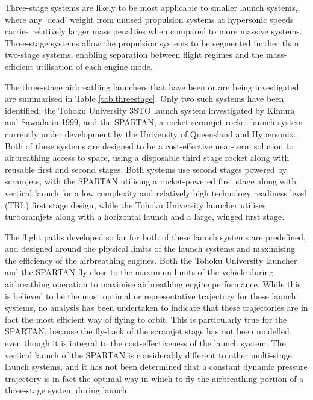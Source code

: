 Three-stage systems are likely to be most applicable to smaller launch systems, where any `dead' weight from unused propulsion systems at hypersonic speeds carries relatively larger mass penalties when compared to more massive systems. Three-stage systems allow the propulsion systems to be segmented further than two-stage systems, enabling separation between flight regimes and the mass-efficient utilisation of each engine mode\cite{Preller2017b}.

The three-stage airbreathing launchers that have been or are being investigated are summarised in Table \ref{tab:threestage}. Only two such systems have been identified; the Tohoku University 3STO launch system investigated by Kimura and Sawada in 1999\cite{Kimura1999}, and the SPARTAN, a rocket-scramjet-rocket launch system currently under development by the University of Queensland and Hypersonix\cite{Preller2017b,Hypersonix}. Both of these systems are designed to be a cost-effective near-term solution to airbreathing access to space, using a disposable third stage rocket along with reusable first and second stages. Both systems use second stages powered by scramjets, with the SPARTAN utilising a rocket-powered first stage along with vertical launch for a low complexity and relatively high technology readiness level (TRL) first stage design, while the Tohoku University launcher utilises turboramjets along with a horizontal launch and a large, winged first stage\cite{Kimura1999}. 

 The flight paths developed so far for both of these launch systems are predefined, and designed around the physical limits of the launch systems and maximising the efficiency of the airbreathing engines. Both the Tohoku University launcher and the SPARTAN fly close to the maximum limits of the vehicle during airbreathing operation to maximise airbreathing engine performance\cite{Preller2017b,Kimura1999}.
While this is believed to be the most optimal or representative trajectory for these launch systems, no analysis has been undertaken to indicate that these trajectories are in fact the most efficient way of flying to orbit. This is particularly true for the SPARTAN, because the fly-back of the scramjet stage has not been modelled, even though it is integral to the cost-effectiveness of the launch system\cite{Preller2017b}. 
The vertical launch of the SPARTAN is considerably different to other multi-stage launch systems, and it has not been determined that a constant dynamic pressure trajectory is in-fact the optimal way in which to fly the airbreathing portion of a three-stage system during launch. 


